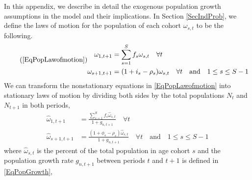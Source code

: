 \documentclass[letterpaper,12pt]{article}
\theoremstyle{definition}
\begin{document}
  \setcounter{equation}{0}

  In this appendix, we describe in detail the exogenous population growth assumptions in the model and their implications. In Section \ref{SecIndProb}, we define the laws of motion for the population of each cohort $\omega_{s,t}$ to be the following.
  \begin{equation}\tag{\ref{EqPopLawofmotion}}
    \begin{split}
      \omega_{1,t+1} &= \sum_{s=1}^S f_s\omega_{s,t}\quad\forall t \\
      \omega_{s+1,t+1} &= (1 + i_s - \rho_s)\omega_{s,t}\quad\forall t\quad\text{and}\quad 1\leq s \leq S-1
    \end{split}
  \end{equation}
  We can transform the nonstationary equations in \eqref{EqPopLawofmotion} into stationary laws of motion by dividing both sides by the total populations $N_t$ and $N_{t+1}$ in both periods,
  \begin{equation}\label{EqPopLawofmotionStat}
    \begin{split}
      \hat{\omega}_{1,t+1} &= \frac{\sum_{s=1}^S f_s\hat{\omega}_{s,t}}{1+g_{n,t+1}}\quad\forall t \\
      \hat{\omega}_{s+1,t+1} &= \frac{(1 + \phi_s - \rho_s)\hat{\omega}_{s,t}}{1+g_{n,t+1}}\quad\forall t\quad\text{and}\quad 1\leq s \leq S-1
    \end{split}
  \end{equation}
  where $\hat{\omega}_{s,t}$ is the percent of the total population in age cohort $s$ and the population growth rate $g_{n,t+1}$ between periods $t$ and $t+1$ is defined in \eqref{EqPopGrowth},
\end{document}
